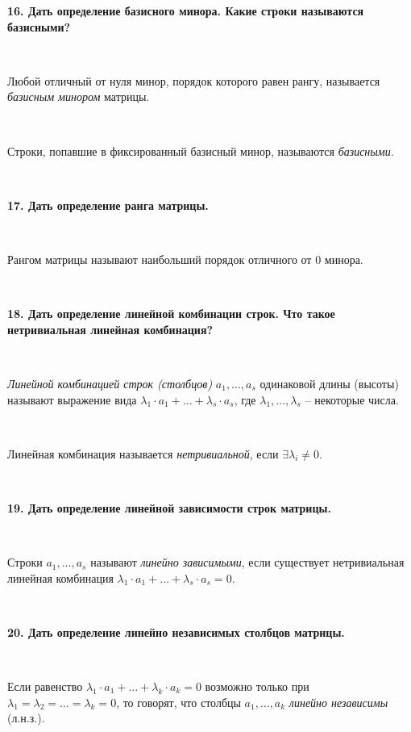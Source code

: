 \documentclass{article}
\begin{document}
	\textbf{16. Дать определение базисного минора. Какие строки называются базисными?}
	
	{
		$\;$
		\setlength{\parindent}{0.4cm}
		\hangindent=0.4cm
		
		Любой отличный от нуля минор, порядок которого равен рангу, называется \textit{базисным	минором} матрицы.
		
		$\;$
		
		Строки, попавшие в фиксированный базисный минор, называются \textit{базисными}.
		
		$\;$
		\setlength{\parindent}{0cm}
		\hangindent=0cm
	}
	
	\textbf{17. Дать определение ранга матрицы.} 
	
	{
		$\;$
		\setlength{\parindent}{0.4cm}
		\hangindent=0.4cm
		
			Рангом матрицы называют наибольший порядок отличного от 0 минора.
		
		$\;$
		\setlength{\parindent}{0cm}
		\hangindent=0cm
	}

	\newpage

	\textbf{18. Дать определение линейной комбинации строк. Что такое нетривиальная линейная комбинация?} 
	
	{
		$\;$
		\setlength{\parindent}{0.4cm}
		\hangindent=0.4cm
		
		\textit{Линейной комбинацией строк (столбцов)} $a_1, \ldots, a_s$ одинаковой длины (высоты) называют выражение вида $\lambda_1\cdot a_1+\ldots+\lambda_s\cdot a_s$, где $\lambda_1, \ldots, \lambda_s$ -- некоторые числа. 
		
		$\;$
		
		Линейная комбинация называется \textit{нетривиальной}, если $\exists \lambda_i\ne 0$.
		
		$\;$
		\setlength{\parindent}{0cm}
		\hangindent=0cm
	}
	
	\textbf{19. Дать определение линейной зависимости строк матрицы.} 
	
	{
		$\;$
		\setlength{\parindent}{0.4cm}
		\hangindent=0.4cm
		
		Строки $a_1, \ldots, a_s$ называют \textit{линейно зависимыми}, если существует нетривиальная линейная комбинация $\lambda_1\cdot a_1+\ldots+\lambda_s\cdot a_s=0$.
		
		$\;$
		\setlength{\parindent}{0cm}
		\hangindent=0cm
	}

	\textbf{20. Дать определение линейно независимых столбцов матрицы.} 
	
	{
		$\;$
		\setlength{\parindent}{0.4cm}
		\hangindent=0.4cm
		
		Если равенство $\lambda_1\cdot a_1+\ldots+\lambda_k\cdot a_k=0$ возможно только при $\lambda_1=\lambda_2=\ldots=\lambda_k=0$, то говорят, что столбцы $a_1, \ldots, a_k$ \textit{линейно независимы} (л.н.з.). 
		
		$\;$
		\setlength{\parindent}{0cm}
		\hangindent=0cm
	}
	
\end{document}
